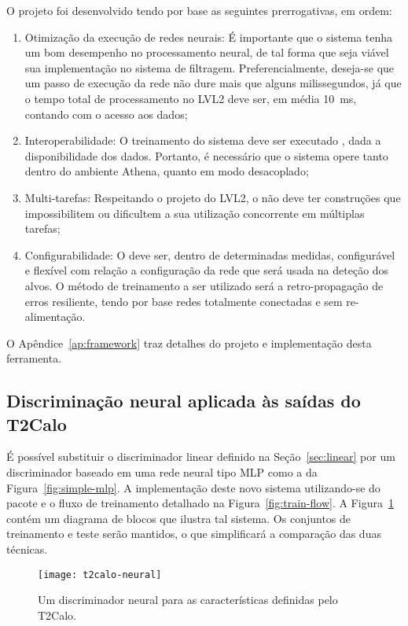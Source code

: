 O projeto foi desenvolvido tendo por base as seguintes prerrogativas, em
ordem:

\begin{enumerate}
\item Otimização da execução de redes neurais: É importante que o sistema
tenha um bom desempenho no processamento neural, de tal forma que seja viável
sua implementação no sistema de filtragem. Preferencialmente, deseja-se que um
passo de execução da rede não dure mais que alguns milissegundos, já que o
tempo total de processamento no LVL2 deve ser, em média 10~ms, contando com o
acesso aos dados;
\item Interoperabilidade: O treinamento do sistema deve ser executado
, dada a disponibilidade dos dados. Portanto, é necessário que o
sistema opere tanto dentro do ambiente Athena, quanto em modo desacoplado;
\item Multi-tarefas: Respeitando o projeto do LVL2, o  não
deve ter construções que impossibilitem ou dificultem a sua utilização
concorrente em múltiplas tarefas;
\item Configurabilidade: O  deve ser, dentro de determinadas
medidas, configurável e flexível com relação a configuração da rede que será
usada na deteção dos alvos. O método de treinamento a ser utilizado será a
retro-propagação de erros resiliente, tendo por base redes totalmente
conectadas e sem re-alimentação.
\end{enumerate}

O Apêndice~\ref{ap:framework} traz detalhes do projeto e implementação
desta ferramenta.

\subsection{Discriminação neural aplicada às saídas do T2Calo}

É possível substituir o discriminador linear definido na
Seção~\ref{sec:linear} por um discriminador baseado em uma rede neural tipo
MLP como a da Figura~\ref{fig:simple-mlp}. A implementação deste novo sistema
utilizando-se do pacote  e o fluxo de treinamento detalhado
na Figura~\ref{fig:train-flow}. A Figura~\ref{fig:t2calo-neural} contém um
diagrama de blocos que ilustra tal sistema. Os conjuntos de treinamento e
teste serão mantidos, o que simplificará a comparação das duas técnicas.

\begin{figure}
\begin{center}
\texttt{[image: t2calo-neural]}
\end{center}
\caption{Um discriminador neural para as características definidas pelo
T2Calo.}
\label{fig:t2calo-neural}
\end{figure}

